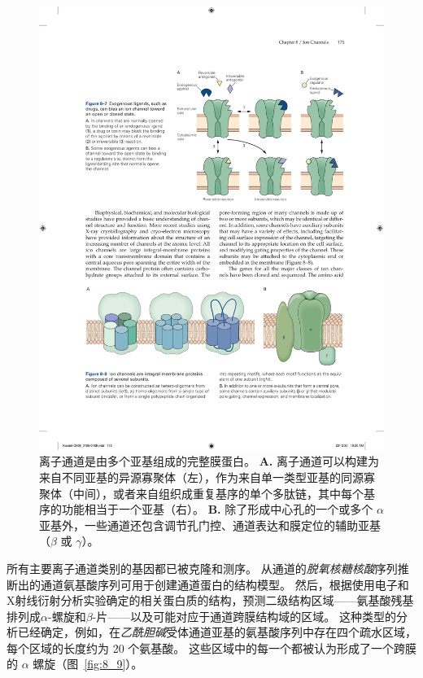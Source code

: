 \begin{figure}[htbp]
	\centering
	\includegraphics[width=1.0\linewidth]{chap08/fig_8_8}
	\caption{离子通道是由多个亚基组成的完整膜蛋白。
		\textbf{A.} 离子通道可以构建为来自不同亚基的异源寡聚体（左），作为来自单一类型亚基的同源寡聚体（中间），或者来自组织成重复基序的单个多肽链，其中每个基序的功能相当于一个亚基（右）。
		\textbf{B.} 除了形成中心孔的一个或多个 $\alpha$ 亚基外，一些通道还包含调节孔门控、通道表达和膜定位的辅助亚基（$\beta$ 或 $\gamma$）。}
	\label{fig:8_8}
\end{figure}


所有主要离子通道类别的基因都已被克隆和测序。
从通道的\textit{脱氧核糖核酸}序列推断出的通道氨基酸序列可用于创建通道蛋白的结构模型。
然后，根据使用电子和X射线衍射分析实验确定的相关蛋白质的结构，预测二级结构区域——氨基酸残基排列成$\alpha$-螺旋和$\beta$-片——以及可能对应于通道跨膜结构域的区域。
这种类型的分析已经确定，例如，在\textit{乙酰胆碱}受体通道亚基的氨基酸序列中存在四个疏水区域，每个区域的长度约为 20 个氨基酸。
这些区域中的每一个都被认为形成了一个跨膜的 $\alpha$ 螺旋（图~\ref{fig:8_9}）。


